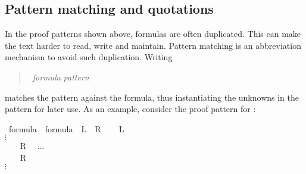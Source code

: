 \begin{isabellebody}
\begin{isamarkuptext}
\subsection{Pattern matching and quotations}

In the proof patterns shown above, formulas are often duplicated.
This can make the text harder to read, write and maintain. Pattern matching
is an abbreviation mechanism to avoid such duplication. Writing
\begin{quote}
 \ \textit{formula}  \textit{pattern}
\end{quote}
matches the pattern against the formula, thus instantiating the unknowns in
the pattern for later use. As an example, consider the proof pattern for
:
\end{isamarkuptext}%
%
\isadelimproof
%
\endisadelimproof
%
\isatagproof
{}\isamarkupfalse%
\ {}formula\ {}\ formula\ {}\ {}{}L\ {}\ {}R{}{}\isanewline
{}\isamarkupfalse%
\isanewline
\ \ \isamarkupfalse%
\ {}{}L{}%
\\\mbox{}\quad$\vdots$\\\mbox{}\hspace{-1.4ex}
\ \ \isamarkupfalse%
\ {}{}R{}\ %
\ $\dots$\\
\isamarkupfalse%
\isanewline
\ \ \isamarkupfalse%
\ {}{}R{}%
\\\mbox{}\quad$\vdots$\\\mbox{}\hspace{-1.4ex}

\end{isabellebody}

